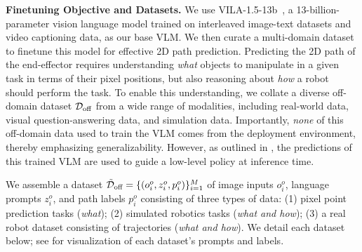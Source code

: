 \textbf{Finetuning Objective and Datasets.}
\label{sec:method:vlm:datasets}
We use VILA-1.5-13b~\citep{vila2024}, a 13-billion-parameter vision language model trained on interleaved image-text datasets and video captioning data, as our base VLM. We then curate a multi-domain dataset to finetune this model for effective 2D path prediction. Predicting the 2D path of the end-effector requires understanding \emph{what} objects to manipulate in a given task in terms of their pixel positions, but also reasoning about \emph{how} a robot should perform the task. To enable this understanding, we collate a diverse off-domain dataset $\mathcal{D}_\text{off}$ from a wide range of modalities, including real-world data, visual question-answering data, and simulation data. Importantly, \emph{none} of this off-domain data used to train the VLM comes from the deployment environment, thereby emphasizing generalizability. However, as outlined in , the predictions of this trained VLM are used to guide a low-level policy at inference time. 

We assemble a dataset $\Tilde{\mathcal{D}}_\text{off} = \{(o_i^o, z_i^o, p_i^o)\}_{i=1}^M$ of image inputs $o^o_i$, language prompts $z_i^o$, and path labels $p_i^o$ consisting of three types of data: (1) pixel point prediction tasks (\emph{what}); (2) simulated robotics tasks (\emph{what and how}); (3) a real robot dataset consisting of trajectories (\emph{what and how}). 
We detail each dataset below; see  for visualization of each dataset's prompts and labels.

